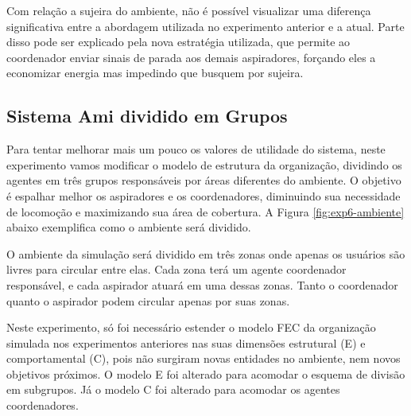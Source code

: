 Com relação a sujeira do ambiente, não é possível visualizar uma diferença significativa entre a abordagem utilizada no experimento anterior e a atual. Parte disso pode ser explicado pela nova estratégia utilizada, que permite ao coordenador enviar sinais de parada aos demais aspiradores, forçando eles a economizar energia mas impedindo que busquem por sujeira.


\subsection{Sistema Ami dividido em Grupos}
\label{sec:grupo}

Para tentar melhorar mais um pouco os valores de utilidade do sistema, neste experimento vamos modificar o modelo de estrutura da organização, dividindo os agentes em três grupos responsáveis por áreas diferentes do ambiente. O objetivo é espalhar melhor os aspiradores e os coordenadores, diminuindo sua necessidade de locomoção e maximizando sua área de cobertura. A Figura \ref{fig:exp6-ambiente} abaixo exemplifica como o ambiente será dividido. 

\begin{figure}[h!]
    \centering
\end{figure}

O ambiente da simulação será dividido em três zonas onde apenas os usuários são livres para circular entre elas. Cada zona terá um agente coordenador responsável, e cada aspirador atuará em uma dessas zonas. Tanto o coordenador quanto o aspirador podem circular apenas por suas zonas. 

Neste experimento, só foi necessário estender o modelo FEC da organização simulada nos experimentos anteriores nas suas dimensões estrutural (E) e comportamental (C), pois não surgiram novas entidades no ambiente, nem novos objetivos próximos. O modelo E foi alterado para acomodar o esquema de divisão em subgrupos. Já o modelo C foi alterado para acomodar os agentes coordenadores.

